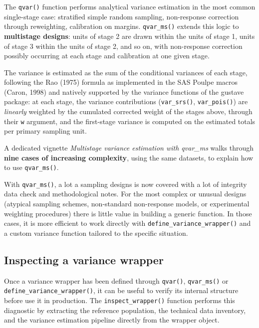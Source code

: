 \documentclass[
]{article}
\begin{document}
The \texttt{qvar()} function performs analytical variance estimation in
the most common single-stage case: stratified simple random sampling,
non-response correction through reweighting, calibration on margins.
\texttt{qvar\_ms()} extends this logic to \textbf{multistage designs}:
units of stage 2 are drawn within the units of stage 1, units of stage 3
within the units of stage 2, and so on, with non-response correction
possibly occurring at each stage and calibration at one given stage.

The variance is estimated as the sum of the conditional variances of
each stage, following the Rao (1975) formula as implemented in the SAS
Poulpe macros (Caron, 1998) and natively supported by the variance
functions of the gustave package: at each stage, the variance
contributions (\texttt{var\_srs()}, \texttt{var\_pois()}) are
\emph{linearly} weighted by the cumulated corrected weight of the stages
above, through their \texttt{w} argument, and the first-stage variance
is computed on the estimated totals per primary sampling unit.

A dedicated vignette \emph{Multistage variance estimation with qvar\_ms}
walks through \textbf{nine cases of increasing complexity}, using the
same datasets, to explain how to use \texttt{qvar\_ms()}.

With \texttt{qvar\_ms()}, a lot a sampling designs is now covered with a
lot of integrity data check and methodological notes. For the most
complex or unusual designs (atypical sampling schemes, non-standard
non-response models, or experimental weighting procedures) there is
little value in building a generic function. In those cases, it is more
efficient to work directly with \texttt{define\_variance\_wrapper()} and
a custom variance function tailored to the specific situation.

\subsection{Inspecting a variance
wrapper}\label{inspecting-a-variance-wrapper}

Once a variance wrapper has been defined through \texttt{qvar()},
\texttt{qvar\_ms()} or \texttt{define\_variance\_wrapper()}, it can be
useful to verify its internal structure before use it in production. The
\texttt{inspect\_wrapper()} function performs this diagnostic by
extracting the reference population, the technical data inventory, and
the variance estimation pipeline directly from the wrapper object.
\end{document}

